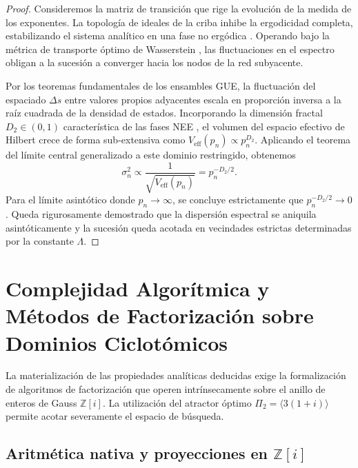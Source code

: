 \documentclass{article}
\numberwithin{equation}{section}
\theoremstyle{plain}
\theoremstyle{definition}
\begin{document}
\begin{proof}
Consideremos la matriz de transición que rige la evolución de la medida de los exponentes. La topología de ideales de la criba inhibe la ergodicidad completa, estabilizando el sistema analítico en una fase no ergódica \cite{Kravtsov2015}. Operando bajo la métrica de transporte óptimo de Wasserstein \cite{Bourne2021}, las fluctuaciones en el espectro obligan a la sucesión a converger hacia los nodos de la red subyacente.

Por los teoremas fundamentales de los ensambles GUE, la fluctuación del espaciado $\Delta s$ entre valores propios adyacentes escala en proporción inversa a la raíz cuadrada de la densidad de estados. Incorporando la dimensión fractal $D_2 \in (0, 1)$ característica de las fases NEE \cite{Khaymovich2021}, el volumen del espacio efectivo de Hilbert crece de forma sub-extensiva como $V_{\text{eff}}(p_n) \propto p_n^{D_2}$. Aplicando el teorema del límite central generalizado a este dominio restringido, obtenemos
\begin{equation}
    \sigma^2_n \propto \frac{1}{\sqrt{V_{\text{eff}}(p_n)}} = p_n^{-D_2/2}.
\end{equation}
Para el límite asintótico donde $p_n \to \infty$, se concluye estrictamente que $p_n^{-D_2/2} \to 0$. Queda rigurosamente demostrado que la dispersión espectral se aniquila asintóticamente y la sucesión queda acotada en vecindades estrictas determinadas por la constante $\Lambda$.
\end{proof}

\section{Complejidad Algorítmica y Métodos de Factorización sobre Dominios Ciclotómicos}
\label{sec:implementacion}

La materialización de las propiedades analíticas deducidas exige la formalización de algoritmos de factorización que operen intrínsecamente sobre el anillo de enteros de Gauss $\mathbb{Z}[i]$. La utilización del atractor óptimo $\Pi_2 = \langle 3(1+i) \rangle$ permite acotar severamente el espacio de búsqueda.

\subsection{Aritmética nativa y proyecciones en \texorpdfstring{$\mathbb{Z}[i]$}{Z[i]}}
\end{document}
